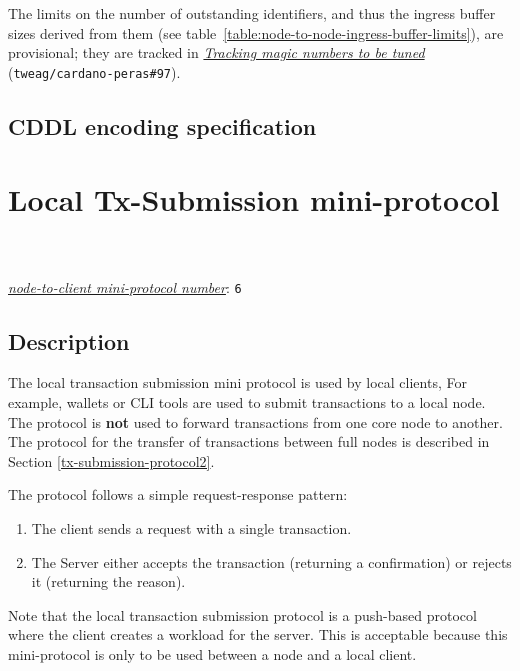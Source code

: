 \noindent
The limits on the number of outstanding identifiers, and thus the ingress
buffer sizes derived from them (see
table~\ref{table:node-to-node-ingress-buffer-limits}), are provisional; they
are tracked in
\href{https://github.com/tweag/cardano-peras/issues/97}{\textit{Tracking
magic numbers to be tuned}} (\texttt{tweag/cardano-peras\#97}).

\subsection{CDDL encoding specification}\label{object-diffusion-cddl}


\section{Local Tx-Submission mini-protocol}
\\
\\
\hyperref[table:node-to-client-protocol-numbers]{\textit{node-to-client mini-protocol number}}: \texttt{6}\\
\label{local-tx-submission-protocol}
\subsection{Description}
The local transaction submission mini protocol is used by local clients,
For example, wallets or CLI tools are used to submit transactions to a local node.
The protocol is {\bf not} used to forward transactions from one core node to another.
The protocol for the transfer of transactions between full nodes
is described in Section \ref{tx-submission-protocol2}.

The protocol follows a simple request-response pattern:
\begin{enumerate}
\item The client sends a request with a single transaction.
\item The Server either accepts the transaction (returning a confirmation) or rejects it (returning the
  reason).
\end{enumerate}
Note that the local transaction submission protocol is a push-based protocol where the client
creates a workload for the server.
This is acceptable because this mini-protocol is only to be used between a node and a local client.
\newcommand{\MsgSubmitTx}{\msg{MsgSubmitTx}}
\newcommand{\MsgAcceptTx}{\msg{MsgAcceptTx}}
\newcommand{\MsgRejectTx}{\msg{MsgRejectTx}}

